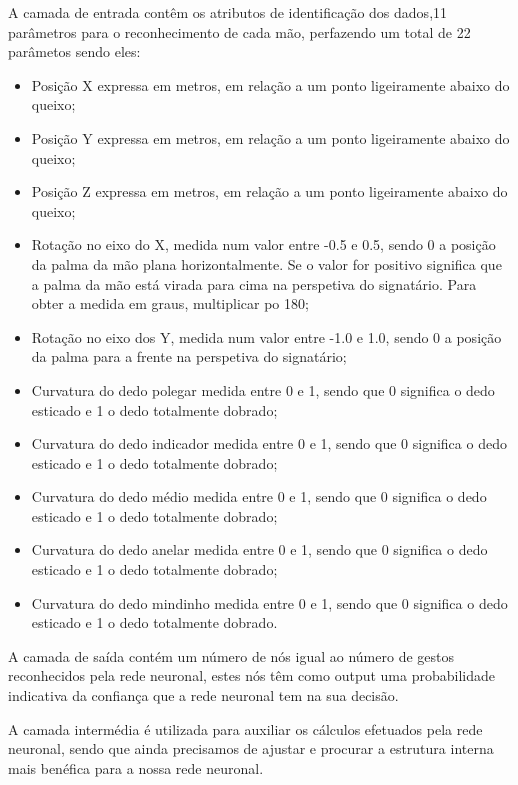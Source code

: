 \documentclass[10pt,a4paper]{article}
\begin{document}
A camada de entrada contêm os atributos de identificação dos dados,11 parâmetros para o reconhecimento de cada mão, perfazendo um total de 22 parâmetos sendo eles:
\begin{itemize}
\item Posição X expressa em metros, em relação a um ponto ligeiramente abaixo do queixo;
\item Posição Y expressa em metros, em relação a um ponto ligeiramente abaixo do queixo;
\item Posição Z expressa em metros, em relação a um ponto ligeiramente abaixo do queixo;
\item Rotação no eixo do X, medida num valor entre -0.5 e 0.5, sendo 0 a posição da palma da mão plana horizontalmente. Se o valor for positivo significa que a palma da mão está virada para cima na perspetiva do signatário. Para obter a medida em graus, multiplicar po 180;
\item Rotação no eixo dos Y, medida num valor entre -1.0 e 1.0, sendo 0 a posição da palma para a frente na perspetiva do signatário;
\item Curvatura do dedo polegar medida entre 0 e 1, sendo que 0 significa o dedo esticado e 1 o dedo totalmente dobrado;
\item Curvatura do dedo indicador medida entre 0 e 1, sendo que 0 significa o dedo esticado e 1 o dedo totalmente dobrado;
\item Curvatura do dedo médio medida entre 0 e 1, sendo que 0 significa o dedo esticado e 1 o dedo totalmente dobrado;
\item Curvatura do dedo anelar medida entre 0 e 1, sendo que 0 significa o dedo esticado e 1 o dedo totalmente dobrado;
\item Curvatura do dedo mindinho medida entre 0 e 1, sendo que 0 significa o dedo esticado e 1 o dedo totalmente dobrado.
\end{itemize}


A camada de saída contém um número de nós igual ao número de gestos reconhecidos pela rede neuronal, estes nós têm como output uma probabilidade indicativa da confiança que a rede neuronal tem na sua decisão.

A camada intermédia é utilizada para auxiliar os cálculos efetuados pela rede neuronal, sendo que ainda precisamos de ajustar e procurar a estrutura interna mais benéfica para a nossa rede neuronal.
\end{document}
